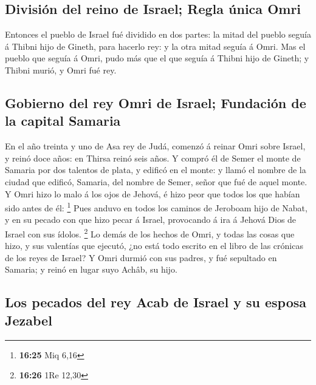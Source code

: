 \hypertarget{divisiuxf3n-del-reino-de-israel-regla-uxfanica-omri}{%
\subsection{División del reino de Israel; Regla única
Omri}\label{divisiuxf3n-del-reino-de-israel-regla-uxfanica-omri}}

 Entonces el pueblo de Israel fué dividido en dos partes:
la mitad del pueblo seguía á Thibni hijo de Gineth, para hacerlo rey: y
la otra mitad seguía á Omri.  Mas el pueblo que seguía á
Omri, pudo más que el que seguía á Thibni hijo de Gineth; y Thibni
murió, y Omri fué rey.

\hypertarget{gobierno-del-rey-omri-de-israel-fundaciuxf3n-de-la-capital-samaria}{%
\subsection{Gobierno del rey Omri de Israel; Fundación de la capital
Samaria}\label{gobierno-del-rey-omri-de-israel-fundaciuxf3n-de-la-capital-samaria}}

 En el año treinta y uno de Asa rey de Judá, comenzó á
reinar Omri sobre Israel, y reinó doce años: en Thirsa reinó seis años.
 Y compró él de Semer el monte de Samaria por dos talentos
de plata, y edificó en el monte: y llamó el nombre de la ciudad que
edificó, Samaria, del nombre de Semer, señor que fué de aquel monte.
 Y Omri hizo lo malo á los ojos de Jehová, é hizo peor que
todos los que habían sido antes de él: \footnote{\textbf{16:25} Miq 6,16}
 Pues anduvo en todos los caminos de Jeroboam hijo de
Nabat, y en su pecado con que hizo pecar á Israel, provocando á ira á
Jehová Dios de Israel con sus ídolos. \footnote{\textbf{16:26} 1Re 12,30}
 Lo demás de los hechos de Omri, y todas las cosas que
hizo, y sus valentías que ejecutó, ¿no está todo escrito en el libro de
las crónicas de los reyes de Israel?  Y Omri durmió con sus
padres, y fué sepultado en Samaria; y reinó en lugar suyo Achâb, su
hijo.

\hypertarget{los-pecados-del-rey-acab-de-israel-y-su-esposa-jezabel}{%
\subsection{Los pecados del rey Acab de Israel y su esposa
Jezabel}\label{los-pecados-del-rey-acab-de-israel-y-su-esposa-jezabel}}

